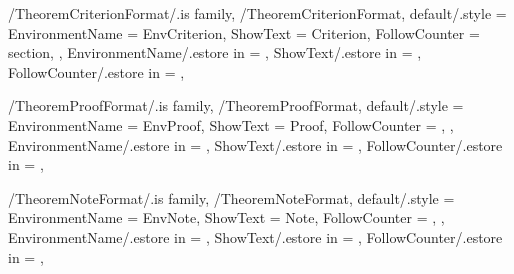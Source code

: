 
\pgfkeys
{
  /TheoremCriterionFormat/.is family, /TheoremCriterionFormat,
  default/.style =
  {
    EnvironmentName = {EnvCriterion},
    ShowText = {Criterion},
    FollowCounter = section,
  },
  EnvironmentName/.estore in = \GetTheoremCriterionFormatEnvironmentName,
  ShowText/.estore in = \GetTheoremCriterionFormatShowText,
  FollowCounter/.estore in = \GetTheoremCriterionFormatFollowCounter,
} %

\newcommand{\InsertCriterion}[2][\empty]
{%
  \InsertTheoremContent[#1]{\GetTheoremCriterionFormatEnvironmentName}{#2}%
} %

\newcommand{\InitTheoremCriterionFormat}
{%
  \ifthenelse{\equal{\GetTheoremCriterionFormatFollowCounter}{\empty}}%
  {%
    \newtheorem{%
      \GetTheoremCriterionFormatEnvironmentName}{%
      \GetTheoremCriterionFormatShowText}%
  }%
  {%
    \newtheorem{%
      \GetTheoremCriterionFormatEnvironmentName}{%
      \GetTheoremCriterionFormatShowText}[%
      \GetTheoremCriterionFormatFollowCounter]%
  }%
} %


\pgfkeys
{
  /TheoremProofFormat/.is family, /TheoremProofFormat,
  default/.style =
  {
    EnvironmentName = {EnvProof},
    ShowText = {Proof},
    FollowCounter = \empty,
  },
  EnvironmentName/.estore in = \GetTheoremProofFormatEnvironmentName,
  ShowText/.estore in = \GetTheoremProofFormatShowText,
  FollowCounter/.estore in = \GetTheoremProofFormatFollowCounter,
} %

\newcommand{\InsertProof}[1]
{%
  \InsertTheoremContent[\empty]{%
    \GetTheoremProofFormatEnvironmentName}{#1}%
} %

\newcommand{\InitTheoremProofFormat}
{%
  \ifthenelse{\equal{\GetTheoremProofFormatFollowCounter}{\empty}}%
  {%
    \newtheorem*{%
      \GetTheoremProofFormatEnvironmentName}{%
      \GetTheoremProofFormatShowText}
  }%
  {%
    \newtheorem{%
      \GetTheoremProofFormatEnvironmentName}{%
      \GetTheoremProofFormatShowText}[%
      \GetTheoremProofFormatFollowCounter]%
  }%
} %


\pgfkeys
{
  /TheoremNoteFormat/.is family, /TheoremNoteFormat,
  default/.style =
  {
    EnvironmentName = {EnvNote},
    ShowText = {Note},
    FollowCounter = \empty,
  },
  EnvironmentName/.estore in = \GetTheoremNoteFormatEnvironmentName,
  ShowText/.estore in = \GetTheoremNoteFormatShowText,
  FollowCounter/.estore in = \GetTheoremNoteFormatFollowCounter,
} %

